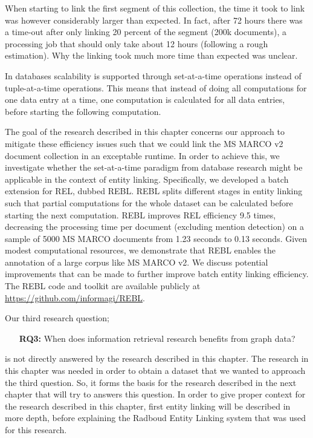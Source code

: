 When starting to link the first segment of this collection, the time it took to link was however considerably larger than expected. In fact, after 72 hours there was a time-out after only linking 20 percent of the segment (200k documents), a processing job that should only take about 12 hours (following a rough estimation). Why the linking took much more time than expected was unclear. 

In databases scalability is supported through set-at-a-time operations instead of tuple-at-a-time operations. This means that instead of doing all computations for one data entry at a time, one computation is calculated for all data entries, before starting the following computation. 

The goal of the research described in this chapter concerns our approach to mitigate these efficiency issues such that we could link the MS MARCO v2 document collection in an exceptable runtime. 
In order to achieve this, we investigate whether the set-at-a-time paradigm from database research might be applicable in the context of entity linking.  Specifically, we developed a batch extension for REL, dubbed REBL. REBL splits different stages in entity linking such that partial computations for the whole dataset can be calculated before starting the next computation.
REBL improves REL efficiency 9.5 times, decreasing the processing time per document (excluding mention detection) on a sample of 5000 MS MARCO documents from 1.23 seconds to 0.13 seconds. Given modest computational resources, we demonstrate that REBL enables the annotation of a large corpus like MS MARCO v2. We discuss potential improvements that can be made to further improve batch entity linking efficiency. The REBL code and toolkit are available publicly at \url{https://github.com/informagi/REBL}.

Our third research question; 
\begin{itemize}
	\item[\textbf{RQ3:}] When does information retrieval research benefits from graph data?
\end{itemize} 
is not directly answered by the research described in this chapter. The research in this chapter was needed in order to obtain a dataset that we wanted to approach the third question. So, it forms the basis for the research described in the next chapter that will try to answers this question. In order to give proper context for the research described in this chapter, first entity linking will be described in more depth, before explaining the Radboud Entity Linking system that was used for this research. 

